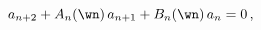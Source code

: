 \begin{equation}
a_{n+2} + A_n(\wn) \, a_{n+1} + B_n(\wn) \, a_n = 0\,, 
\label{recurrence}
\end{equation}

